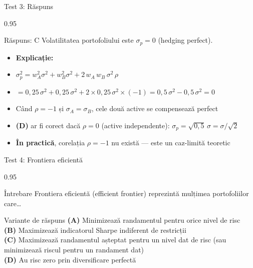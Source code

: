 \documentclass[9pt, aspectratio=169, t]{beamer}
\begin{document}
\begin{frame}[shrink=10]{Test 3: Răspuns}
\begin{cminipage}{0.95\textwidth}
    \begin{exampleblock}{Răspuns: C}
        Volatilitatea portofoliului este $\sigma_p = 0$ (hedging perfect).
    \end{exampleblock}
    \vspace{0.2cm}
    \begin{itemize}\setlength{\itemsep}{0pt}
        \item \textbf{Explicație:}
        \item $\sigma_p^2 = w_A^2 \sigma^2 + w_B^2 \sigma^2 + 2\,w_A\,w_B\,\sigma^2\,\rho$
        \item $= 0{,}25\,\sigma^2 + 0{,}25\,\sigma^2 + 2 \times 0{,}25\,\sigma^2 \times (-1) = 0{,}5\,\sigma^2 - 0{,}5\,\sigma^2 = 0$
        \item Când $\rho = -1$ și $\sigma_A = \sigma_B$, cele două active se compensează perfect
        \item \textbf{(D)} ar fi corect dacă $\rho = 0$ (active independente): $\sigma_p = \sqrt{0{,}5}\,\sigma = \sigma/\sqrt{2}$
        \item \textbf{În practică}, corelația $\rho = -1$ nu există --- este un caz-limită teoretic
    \end{itemize}
\end{cminipage}
\end{frame}

\begin{frame}[shrink=10]{Test 4: Frontiera eficientă}
\begin{cminipage}{0.95\textwidth}
    \begin{alertblock}{Întrebare}
        Frontiera eficientă (efficient frontier) reprezintă mulțimea portofoliilor care\ldots
    \end{alertblock}

    \vspace{0.5cm}
    \begin{block}{Variante de răspuns}
    \textcolor{MainBlue}{\textbf{(A)}} Minimizează randamentul pentru orice nivel de risc\\[3pt]
    \textcolor{MainBlue}{\textbf{(B)}} Maximizează indicatorul Sharpe indiferent de restricții\\[3pt]
    \textcolor{MainBlue}{\textbf{(C)}} Maximizează randamentul așteptat pentru un nivel dat de risc (sau minimizează riscul pentru un randament dat)\\[3pt]
    \textcolor{MainBlue}{\textbf{(D)}} Au risc zero prin diversificare perfectă
    \end{block}
\end{cminipage}
\end{frame}
\end{document}

